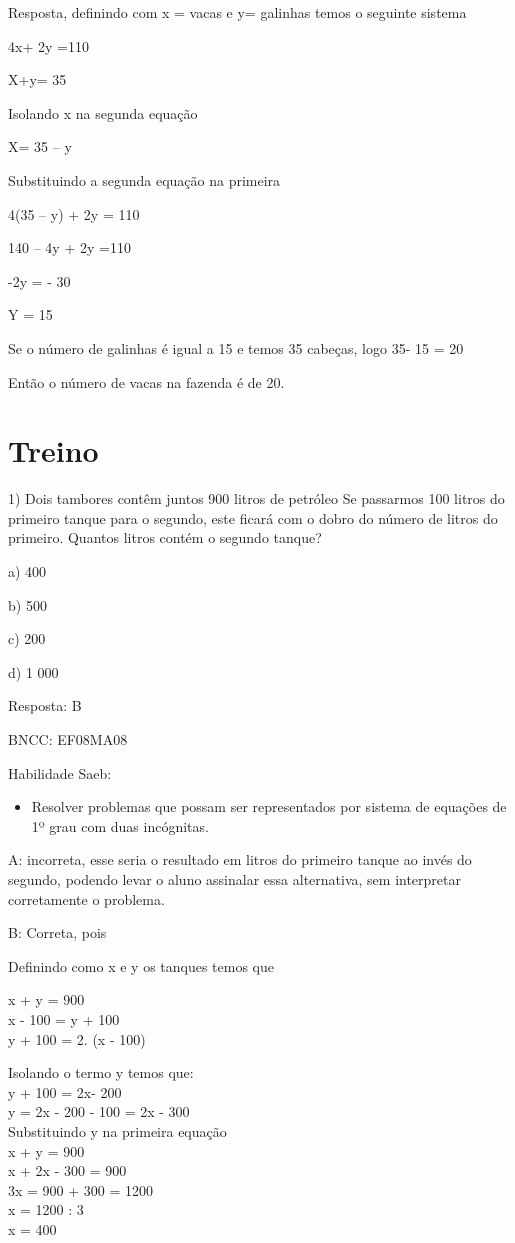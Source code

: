 Resposta, definindo com x = vacas e y= galinhas temos o seguinte sistema

4x+ 2y =110

X+y= 35

Isolando x na segunda equação

X= 35 -- y

Substituindo a segunda equação na primeira

4(35 -- y) + 2y = 110

140 -- 4y + 2y =110

-2y = - 30

Y = 15

Se o número de galinhas é igual a 15 e temos 35 cabeças, logo 35- 15 =
20

Então o número de vacas na fazenda é de 20.

\section{Treino}

1) Dois tambores contêm juntos 900 litros de petróleo Se passarmos 100
litros do primeiro tanque para o segundo, este ficará com o dobro do
número de litros do primeiro. Quantos litros contém o segundo tanque?

a) 400

b) 500

c) 200

d) 1 000

Resposta: B

BNCC: EF08MA08

Habilidade Saeb:

\begin{itemize}
\tightlist
\item
  Resolver problemas que possam ser representados por sistema de
  equações de 1º grau com duas incógnitas.
\end{itemize}

A: incorreta, esse seria o resultado em litros do primeiro tanque ao
invés do segundo, podendo levar o aluno assinalar essa alternativa, sem
interpretar corretamente o problema.

B: Correta, pois

Definindo como x e y os tanques temos que

x + y = 900\\
x - 100 = y + 100\\
y + 100 = 2. (x - 100)

Isolando o termo y temos que:\\
y + 100 = 2x- 200\\
y = 2x - 200 - 100 = 2x - 300\\
Substituindo y na primeira equação\\
x + y = 900\\
x + 2x - 300 = 900\\
3x = 900 + 300 = 1200\\
x = 1200 : 3\\
x = 400

